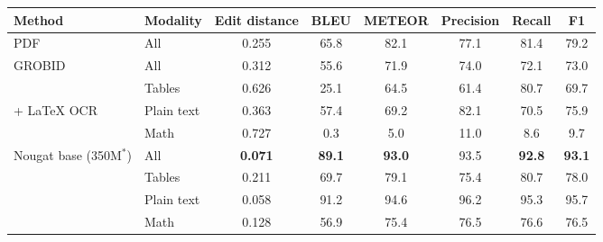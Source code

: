 \centering
\begin{tabular}{l|lcccccc}
\toprule
Method & Modality & Edit distance & BLEU & METEOR & Precision & Recall & F1 \\ \midrule
PDF                  & All      & 0.255 & 65.8 & 82.1 & 77.1 & 81.4 & 79.2 \\ \hline
GROBID               & All      & 0.312 & 55.6 & 71.9 & 74.0 & 72.1 & 73.0 \\ \cline{2-8}
                     &Tables    & 0.626 & 25.1 & 64.5 & 61.4 & 80.7 & 69.7 \\
+ LaTeX OCR %
                     & Plain text &0.363 & 57.4 & 69.2 & 82.1 & 70.5 & 75.9 \\
                     & Math     & 0.727 & 0.3 & 5.0 & 11.0 & 8.6 & 9.7 \\ \hline
\multirow{4}{*}{Nougat base (350M$^\ast$)} & All & \bf 0.071 & \bf 89.1 & \bf 93.0 & 93.5 & \bf 92.8 & \bf 93.1 \\ \cline{2-8}
                     & Tables     & 0.211 & 69.7 & 79.1 & 75.4 & 80.7 & 78.0 \\ 
                     & Plain text & 0.058         & 91.2 & 94.6   & 96.2      & 95.3   & 95.7 \\
                     & Math       & 0.128         & 56.9 & 75.4   & 76.5      & 76.6   & 76.5 \\ \bottomrule
\end{tabular}